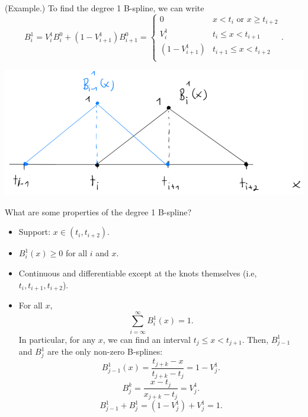\documentclass[letterpaper]{article}
\begin{document}
\begin{mdframed}[nobreak=true]
    (Example.) To find the degree 1 B-spline, we can write 
    \[B_{i}^{1} = V_{i}^{1} B_{i}^{0} + (1 - V_{i + 1}^{1}) B_{i + 1}^{0} = \begin{cases}
        0 & x < t_i \text{ or } x \geq t_{i + 2} \\ 
        V_{i}^{1} & t_i \leq x < t_{i + 1} \\ 
        (1 - V_{i + 1}^{1}) & t_{i + 1} \leq x < t_{i + 2} \\ 
    \end{cases}.\]
    \begin{center}
        \includegraphics[scale=0.6]{../assets/bspline_3.png}
    \end{center}
\end{mdframed}
What are some properties of the degree 1 B-spline? 
\begin{itemize}
    \item Support: $x \in (t_{i}, t_{i + 2})$.
    \item $B_{i}^{1}(x) \geq 0$ for all $i$ and $x$.
    \item Continuous and differentiable except at the knots themselves (i.e, $t_{i}, t_{i + 1}, t_{i + 2}$).
    \item For all $x$, 
    \[\sum_{i = \infty}^{\infty} B_{i}^{1}(x) = 1.\]
    In particular, for any $x$, we can find an interval $t_{j} \leq x < t_{j + 1}$. Then, $B_{j - 1}^{1}$ and $B_{j}^{1}$ are the only non-zero B-splines:
    \[B_{j - 1}^{1}(x) = \frac{t_{j + k} - x}{t_{j + k} - t_j} = 1 - V_{j}^{1}.\]
    \[B_{j}^{k} = \frac{x - t_j}{x_{j + k} - t_j} = V_{j}^{1}.\]
    \[B_{j - 1}^{1} + B_{j}^{1} = (1 - V_j^{1}) + V_j^1 = 1.\]
\end{itemize}
\end{document}
